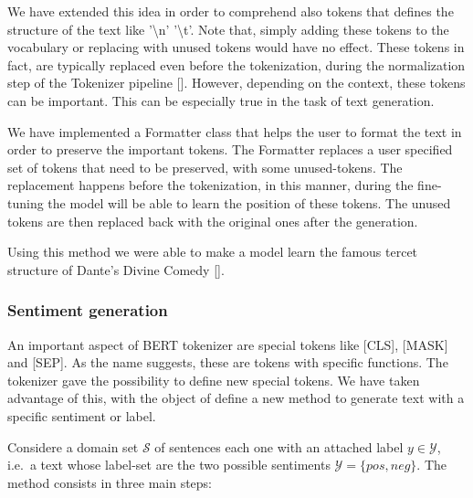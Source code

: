 \documentclass[10pt,twocolumn,letterpaper]{article}
\begin{document}
We have extended this idea in order to comprehend also tokens that defines the structure of the text like '\textbackslash n' '\textbackslash t'.
Note that, simply adding these tokens to the vocabulary or replacing with unused tokens would have no effect.
These tokens in fact, are typically replaced even before the tokenization, during the normalization step of the Tokenizer pipeline [].
However, depending on the context, these tokens can be important. This can be especially true in the task of text generation.

We have implemented a Formatter class that helps the user to format the text in order to preserve the important tokens.
The Formatter replaces a user specified set of tokens that need to be preserved, with some unused-tokens.
The replacement happens before the tokenization, in this manner, during the fine-tuning the model will be able to learn
the position of these  tokens. The unused tokens are then replaced back with the original ones after the generation.

Using this method we were able to make a model learn the famous tercet structure of Dante's Divine Comedy \ref{}.

\subsubsection{Sentiment generation}
\label{sentiment}
An important aspect of BERT tokenizer are special tokens like [CLS], [MASK] and [SEP].
As the name suggests, these are tokens with specific functions.
The tokenizer gave the possibility to define new special tokens.
We have taken advantage of this, with the object of define a new method to generate text with a specific sentiment or label.

Considere a domain set $\mathcal S$ of sentences each one with an attached label $y\in \mathcal Y$, i.e.\ a text whose label-set are the two possible sentiments $\mathcal Y =\{pos, neg\}$.
The method consists in three main steps:
\end{document}
